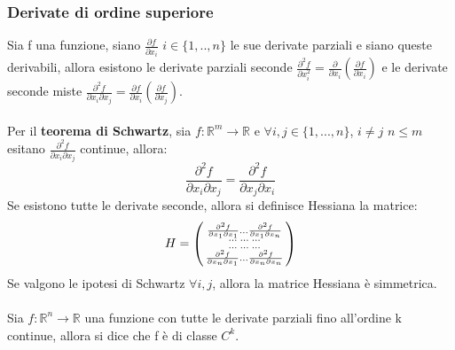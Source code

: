\documentclass{article}
\newcommand{\R}{\mathds{R}}
\begin{document}
\subsubsection{Derivate di ordine superiore}
Sia f una funzione, siano $\frac{\partial f}{\partial x_i}$ $i\in\{1,..,n\}$ le sue derivate parziali e siano queste derivabili, allora esistono le derivate parziali seconde $\frac{\partial^2 f}{\partial x_i^2}=\frac{\partial}{\partial x_i}\left(\frac{\partial f}{\partial x_i}\right)$ e le derivate seconde miste $\frac{\partial^2 f}{\partial x_i \partial x_j}=\frac{\partial f}{\partial x_i}\left(\frac{\partial f}{\partial x_j}\right)$.\\\\
Per il \textbf{teorema di Schwartz}, sia $f:\R^m\rightarrow\R$ e $\forall i,j\in\{1,...,n\}$, $i\neq j$ $n\leq m$ esitano $\frac{\partial^2f}{\partial x_i \partial x_j}$ continue, allora:
$$\frac{\partial^2f}{\partial x_i \partial x_j}=\frac{\partial^2f}{\partial x_j \partial x_i}$$
Se esistono tutte le derivate seconde, allora si definisce Hessiana la matrice:
$$ H=\begin{psmallmatrix} \frac{\partial^2f}{\partial x_1 \partial x_1} ... \frac{\partial^2f}{\partial x_1 \partial x_n} \\ ...\;...\;... \\ ...\;...\;... \\ \frac{\partial^2f}{\partial x_n \partial x_1} ... \frac{\partial^2f}{\partial x_n \partial x_n} \end{psmallmatrix}$$
Se valgono le ipotesi di Schwartz $\forall i,j$, allora la matrice Hessiana è simmetrica.\\\\
Sia $f:\R^n\rightarrow\R$ una funzione con tutte le derivate parziali fino all'ordine k continue, allora si dice che f è di classe $C^k$.
\end{document}
